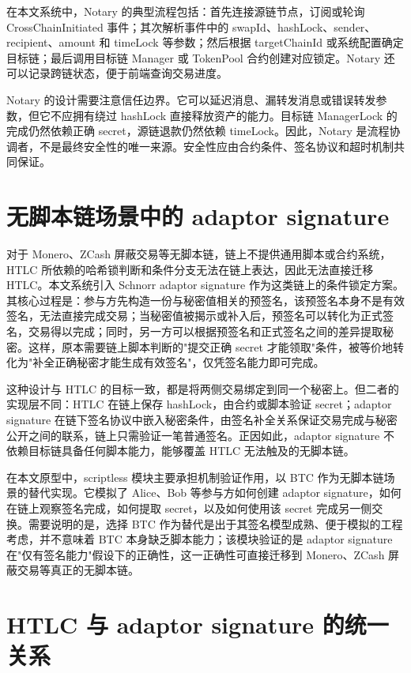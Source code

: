 在本文系统中，Notary 的典型流程包括：首先连接源链节点，订阅或轮询 CrossChainInitiated 事件；其次解析事件中的 swapId、hashLock、sender、recipient、amount 和 timeLock 等参数；然后根据 targetChainId 或系统配置确定目标链；最后调用目标链 Manager 或 TokenPool 合约创建对应锁定。Notary 还可以记录跨链状态，便于前端查询交易进度。


Notary 的设计需要注意信任边界。它可以延迟消息、漏转发消息或错误转发参数，但它不应拥有绕过 hashLock 直接释放资产的能力。目标链 ManagerLock 的完成仍然依赖正确 secret，源链退款仍然依赖 timeLock。因此，Notary 是流程协调者，不是最终安全性的唯一来源。安全性应由合约条件、签名协议和超时机制共同保证。


\section{无脚本链场景中的 adaptor signature}


对于 Monero、ZCash 屏蔽交易等无脚本链，链上不提供通用脚本或合约系统，HTLC 所依赖的哈希锁判断和条件分支无法在链上表达，因此无法直接迁移 HTLC。本文系统引入 Schnorr adaptor signature 作为这类链上的条件锁定方案。其核心过程是：参与方先构造一份与秘密值相关的预签名，该预签名本身不是有效签名，无法直接完成交易；当秘密值被揭示或补入后，预签名可以转化为正式签名，交易得以完成；同时，另一方可以根据预签名和正式签名之间的差异提取秘密。这样，原本需要链上脚本判断的"提交正确 secret 才能领取"条件，被等价地转化为"补全正确秘密才能生成有效签名"，仅凭签名能力即可完成。


这种设计与 HTLC 的目标一致，都是将两侧交易绑定到同一个秘密上。但二者的实现层不同：HTLC 在链上保存 hashLock，由合约或脚本验证 secret；adaptor signature 在链下签名协议中嵌入秘密条件，由签名补全关系保证交易完成与秘密公开之间的联系，链上只需验证一笔普通签名。正因如此，adaptor signature 不依赖目标链具备任何脚本能力，能够覆盖 HTLC 无法触及的无脚本链。


在本文原型中，scriptless 模块主要承担机制验证作用，以 BTC 作为无脚本链场景的替代实现。它模拟了 Alice、Bob 等参与方如何创建 adaptor signature，如何在链上观察签名完成，如何提取 secret，以及如何使用该 secret 完成另一侧交换。需要说明的是，选择 BTC 作为替代是出于其签名模型成熟、便于模拟的工程考虑，并不意味着 BTC 本身缺乏脚本能力；该模块验证的是 adaptor signature 在"仅有签名能力"假设下的正确性，这一正确性可直接迁移到 Monero、ZCash 屏蔽交易等真正的无脚本链。


\section{HTLC 与 adaptor signature 的统一关系}


